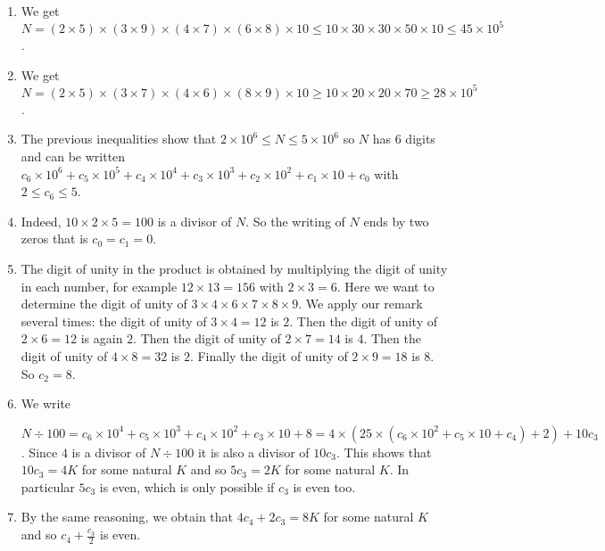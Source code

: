 \begin{enumerate}
\item We get $N = \left(2 \times 5\right) \times
\left(3 \times 9\right) \times
\left(4 \times 7\right) \times
\left(6 \times 8\right) \times 10 \leq
10 \times 30 \times 30 \times 50 \times 10 \leq 45 \times 10^5$.

\item We get $N =
  \left(2 \times 5\right) \times
  \left(3 \times 7\right) \times
  \left(4 \times 6\right) \times
  \left(8 \times 9\right) \times 10 \geq 10 \times 20 \times 20 \times
  70 \geq 28 \times 10^5$.

\item The previous inequalities show that
  $2 \times 10^6 \leq N \leq 5 \times 10^6$ so $N$ has 6 digits
  and can be written
  ${c_6 \times 10^6} + {c_5 \times 10^5} + {c_4 \times 10^4} +
  {c_3 \times 10^3} + {c_2 \times 10^2} + {c_1 \times 10} + c_0$ with
  $2 \leq c_6 \leq 5$.

\item Indeed, $10 \times 2 \times 5 = 100$ is a divisor of $N$. So
  the writing of $N$ ends by two zeros that is $c_0 = c_1 = 0$.

\item The digit of unity in the product is obtained by multiplying the digit of
  unity in each number, for example $12 \times 13 = 156$ with
  $2 \times 3 = 6$. Here we want to determine the digit of unity of
  $3 \times 4 \times 6 \times 7 \times 8 \times 9$. We apply our remark
  several times:
  the digit of unity of $3 \times 4=12$ is $2$. Then the digit of unity of
  $2 \times 6 = 12$ is again $2$. Then the digit of unity of
  $2 \times 7 = 14$ is $4$. Then the digit of unity of
  $4 \times 8 = 32$ is $2$. Finally the digit of unity of
  $2 \times 9 = 18$ is $8$. So $c_2=8$.

\item We write

  $N \div 100 =
  {c_6 \times 10^4} + {c_5 \times 10^3} + {c_4 \times 10^2} +
  {c_3 \times 10} + 8 =
  4 \times \left( 25 \times \left(
  {c_6 \times 10^2} + {c_5 \times 10} + {c_4} \right) + 2 \right) +
  10c_3$. Since $4$ is a divisor of $N \div 100$ it is also a divisor
  of $10c_3$. This shows that $10c_3=4K$ for some natural $K$ and
  so $5c_3=2K$ for some natural $K$. In particular $5c_3$ is even, which is
  only possible if $c_3$ is even too.

\item By the same reasoning, we obtain that
  ${4 c_4} + {2c_3} = 8K$ for some natural $K$ and so
  $c_4 + \frac{c_3}{2}$ is even.


\end{enumerate}
